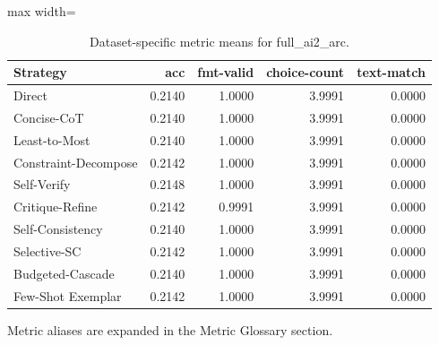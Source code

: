 \documentclass[10pt,twocolumn]{article}
\begin{document}
\begin{table}[t]
\centering
\caption{Dataset-specific metric means for full\_ai2\_arc.}
\label{tab:full_ai2_arc_dataset}
\begin{adjustbox}{max width=\textwidth}
\begin{tabular}{lrrrr}
\toprule
Strategy & acc & fmt-valid & choice-count & text-match \\
\midrule
Direct & 0.2140 & 1.0000 & 3.9991 & 0.0000 \\
Concise-CoT & 0.2140 & 1.0000 & 3.9991 & 0.0000 \\
Least-to-Most & 0.2140 & 1.0000 & 3.9991 & 0.0000 \\
Constraint-Decompose & 0.2142 & 1.0000 & 3.9991 & 0.0000 \\
Self-Verify & 0.2148 & 1.0000 & 3.9991 & 0.0000 \\
Critique-Refine & 0.2142 & 0.9991 & 3.9991 & 0.0000 \\
Self-Consistency & 0.2140 & 1.0000 & 3.9991 & 0.0000 \\
Selective-SC & 0.2142 & 1.0000 & 3.9991 & 0.0000 \\
Budgeted-Cascade & 0.2140 & 1.0000 & 3.9991 & 0.0000 \\
Few-Shot Exemplar & 0.2142 & 1.0000 & 3.9991 & 0.0000 \\
\bottomrule
\end{tabular}
\end{adjustbox}
\vspace{2pt}\parbox{0.98\textwidth}{\footnotesize Metric aliases are expanded in the Metric Glossary section.}
\end{table}
\end{document}
